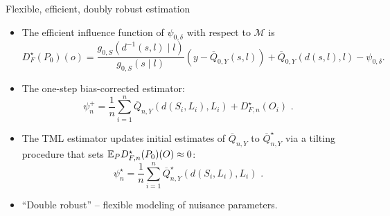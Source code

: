 \documentclass{beamer}
\begin{document}

\begin{frame}[c]{Flexible, efficient, doubly robust estimation}

\begin{center}
\begin{itemize}
  \itemsep8pt
  \item The efficient influence function of $\psi_{0, \delta}$ with respect to
    $\mathcal{M}$ is
    \begin{equation*}
      D^{\star}_{F}(P_0)(o) = \frac{g_{0,S}(d^{-1}(s,l) \mid l)}
      {g_{0,S}(s \mid l)} ({y - \overline{Q}_{0,Y}(s,l)}) +
      \overline{Q}_{0,Y}(d(s,l), l) - \psi_{0,\delta}.
    \end{equation*}
  \item The one-step bias-corrected estimator:
    \begin{equation*}\label{tmle}
        \psi_n^{+} = \frac{1}{n} \sum_{i = 1}^n \overline{Q}_{n,Y}(d(S_i, L_i),
        L_i) + D^{\star}_{F,n}(O_i) \,\, .
      \end{equation*}
  \item The TML estimator updates initial estimates of $\overline{Q}_{n,Y}$ to
    $\overline{Q}_{n,Y}^{\star}$ via a tilting procedure that sets
    $\mathbb{E}_P D^{\star}_{F,n}(P_0)(O) \approx 0$:
    \begin{equation*}\label{tmle}
      \psi_n^{\star} = \frac{1}{n} \sum_{i = 1}^n
      \overline{Q}_{n,Y}^{\star}(d(S_i, L_i), L_i) \,\, .
      \end{equation*}
  \item ``Double robust'' -- flexible modeling of nuisance parameters.
\end{itemize}
\end{center}


\end{frame}
\end{document}
